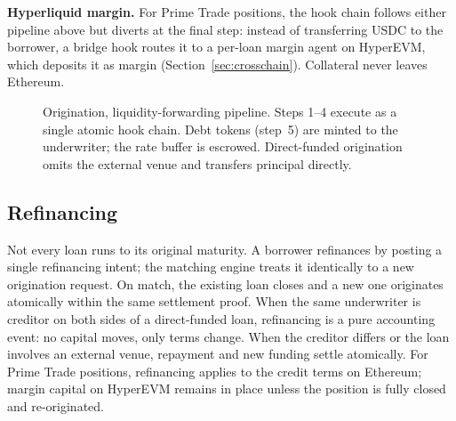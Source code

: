 \textbf{Hyperliquid margin.} For Prime Trade positions, the hook chain follows either pipeline above but diverts at the final step: instead of transferring USDC to the borrower, a bridge hook routes it to a per-loan margin agent on HyperEVM, which deposits it as margin (Section~\ref{sec:crosschain}). Collateral never leaves Ethereum.

\begin{figure}[ht]
  \centering
  \caption{Origination, liquidity-forwarding pipeline. Steps 1--4 execute as a single atomic hook chain. Debt tokens (step~5) are minted to the underwriter; the rate buffer is escrowed. Direct-funded origination omits the external venue and transfers principal directly.}
  \label{fig:origination}
\end{figure}

\subsection{Refinancing}

Not every loan runs to its original maturity. A borrower refinances by posting a single refinancing intent; the matching engine treats it identically to a new origination request. On match, the existing loan closes and a new one originates atomically within the same settlement proof. When the same underwriter is creditor on both sides of a direct-funded loan, refinancing is a pure accounting event: no capital moves, only terms change. When the creditor differs or the loan involves an external venue, repayment and new funding settle atomically. For Prime Trade positions, refinancing applies to the credit terms on Ethereum; margin capital on HyperEVM remains in place unless the position is fully closed and re-originated.


